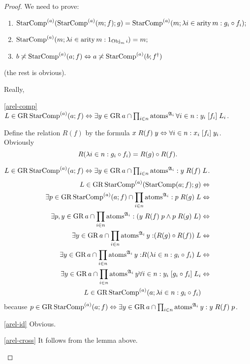 \begin{proof}
We need to prove:
\begin{enumerate}
\item \label{arel-comp}$\operatorname{StarComp}^{(a)}(\operatorname{StarComp}^{(a)}(m;f);g)=\operatorname{StarComp}^{(a)}(m;\lambda i\in\operatorname{arity} m:g_{i}\circ f_{i});$
\item \label{arel-id}$\operatorname{StarComp}^{(a)}(m;\lambda i\in\operatorname{arity} m:1_{\operatorname{Obj}_{m}i})=m;$
\item \label{arel-cross}$b\not\asymp\operatorname{StarComp}^{(a)}(a;f)\Leftrightarrow a\not\asymp\operatorname{StarComp}^{(a)}(b;f^{\dagger})$
\end{enumerate}
(the rest is obvious).

Really,
\begin{widedisorder}
\item [{\ref{arel-comp}}] $L\in\operatorname{GR}\operatorname{StarComp}^{(a)}(a;f)\Leftrightarrow\exists y\in\operatorname{GR} a\cap\prod_{i\in n}\operatorname{atoms}^{\mathfrak{A}_{i}}\forall i\in n:y_{i}\mathrel{\left[f_{i}\right]}L_{i}$.


Define the relation $R(f)$ by the formula $x\mathrel{R(f)}y\Leftrightarrow\forall i\in n:x_{i}\mathrel{\left[f_{i}\right]}y_{i}$.
Obviously
\[
R(\lambda i\in n:g_{i}\circ f_{i})=R(g)\circ R(f).
\]



$L\in\operatorname{GR}\operatorname{StarComp}^{(a)}(a;f)\Leftrightarrow\exists y\in\operatorname{GR} a\cap\prod_{i\in n}\operatorname{atoms}^{\mathfrak{A}_{i}}:y\mathrel{R(f)}L$.
\begin{align*}
L\in\operatorname{GR}\operatorname{StarComp}^{(a)}(\operatorname{StarComp}(a;f);g) & \Leftrightarrow\\
\exists p\in\operatorname{GR}\operatorname{StarComp}^{(a)}(a;f)\cap\prod_{i\in n}\operatorname{atoms}^{\mathfrak{A}_{i}}:p\mathrel{R(g)}L & \Leftrightarrow\\
\exists p,y\in\operatorname{GR} a\cap\prod_{i\in n}\operatorname{atoms}^{\mathfrak{A}_{i}}:(y\mathrel{R(f)}p\land p\mathrel{R(g)}L) & \Leftrightarrow\\
\exists y\in\operatorname{GR} a\cap\prod_{i\in n}\operatorname{atoms}^{\mathfrak{A}_{i}}y:\mathrel{(R(g)\circ R(f))}L & \Leftrightarrow\\
\exists y\in\operatorname{GR} a\cap\prod_{i\in n}\operatorname{atoms}^{\mathfrak{A}_{i}}y:\mathrel{R(\lambda i\in n:g_{i}\circ f_{i})}L & \Leftrightarrow\\
\exists y\in\operatorname{GR} a\cap\prod_{i\in n}\operatorname{atoms}^{\mathfrak{A}_{i}}y\forall i\in n:y_{i}\mathrel{\left[g_{i}\circ f_{i}\right]}L_{i} & \Leftrightarrow\\
L\in\operatorname{GR}\operatorname{StarComp}^{(a)}(a;\lambda i\in n:g_{i}\circ f_{i})
\end{align*}
because $p\in\operatorname{GR}\operatorname{StarComp}^{(a)}(a;f)\Leftrightarrow\exists y\in\operatorname{GR} a\cap\prod_{i\in n}\operatorname{atoms}^{\mathfrak{A}_{i}}y:y\mathrel{R(f)}p$.

\item [{\ref{arel-id}}] Obvious.
\item [{\ref{arel-cross}}] It follows from the lemma above.
\end{widedisorder}
\end{proof}
